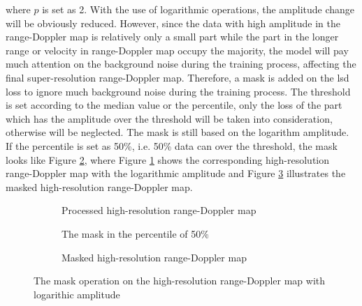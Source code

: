 where $p$ is set as 2. With the use of logarithmic operations, the amplitude change will be obviously reduced. However, since the data with high amplitude in the range-Doppler map is relatively only a small part while the part in the longer range or velocity in range-Doppler map occupy the majority, the model will pay much attention on the background noise during the training process, affecting the final super-resolution range-Doppler map. Therefore, a mask is added on the \gls{lsd} loss to ignore much background noise during the training process. The threshold is set according to the median value or the percentile, only the loss of the part which has the amplitude over the threshold will be taken into consideration, otherwise will be neglected. The mask is still based on the logarithm amplitude. If the percentile is set as 50\%, i.e. 50\% data can over the threshold, the mask looks like Figure \ref{mask in the percentile of 70}, where Figure \ref{high resolution image with logarithic amplitude} shows the corresponding high-resolution range-Doppler map with the logarithmic amplitude and Figure \ref{masked high resolution image with logarithic amplitude} illustrates the masked high-resolution range-Doppler map.

\begin{figure}
    \centering
    \hspace{-0.6cm}
    \begin{subfigure}{0.32\textwidth}
        \centering
        \caption{Processed high-resolution range-Doppler map}
        \label{high resolution image with logarithic amplitude}
    \end{subfigure}
    \begin{subfigure}{0.32\textwidth}
        \centering
        \caption{The mask in the percentile of 50\%}
        \label{mask in the percentile of 70}
    \end{subfigure}
    \begin{subfigure}{0.32\textwidth}
        \centering
        \caption{Masked high-resolution range-Doppler map}
        \label{masked high resolution image with logarithic amplitude}
    \end{subfigure}
    \caption{The mask operation on the high-resolution range-Doppler map with logarithic amplitude}
    \label{mask operation on the high resolution image with logarithic amplitude}
\end{figure}

